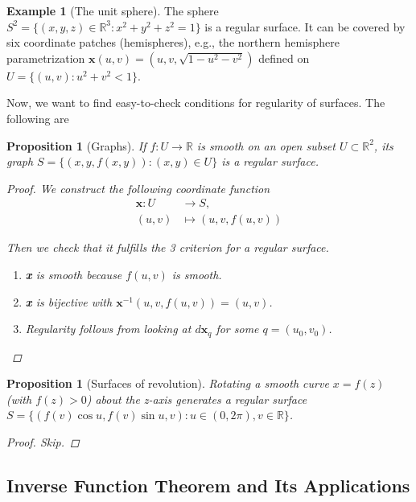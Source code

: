 \documentclass[10pt, a4paper]{article}
\theoremstyle{plain}
\newtheorem{proposition}[theorem]{Proposition}
\theoremstyle{definition}
\newtheorem{example}[theorem]{Example}
\theoremstyle{remark}
\begin{document}
\begin{example}[The unit sphere]
  The sphere $S^2 = \{(x,y,z)\in\mathbb{R}^3: x^2+y^2+z^2=1\}$ is a regular surface. It can be covered by six coordinate patches (hemispheres), e.g., the northern hemisphere parametrization $\mathbf{x}(u,v) = (u,v,\sqrt{1-u^2-v^2})$ defined on $U = \{(u,v): u^2+v^2 < 1\}$.
\end{example}


Now, we want to find easy-to-check conditions for regularity of surfaces. The following are 

\begin{proposition}[Graphs]
  If $f:U\to\mathbb{R}$ is smooth on an open subset $U\subset\mathbb{R}^2$, its graph $S = \{(x,y,f(x,y)) : (x,y)\in U\}$ is a regular surface.

  \begin{proof}
      We construct the following coordinate function
      \begin{align*}
          \textbf{x}:U &\to S, \\
          (u,v) &\mapsto (u,v, f(u,v))
      \end{align*}

      Then we check that it fulfills the 3 criterion for a regular surface.

      \begin{enumerate}
          \item \textbf{x} is smooth because $f(u,v)$ is smooth.
          \item \textbf{x} is bijective with $\textbf{x}^{-1}(u,v, f(u,v)) = (u,v)$.
          \item Regularity follows from looking at $d\textbf{x}_q$ for some $q= (u_0,v_0)$.
      \end{enumerate}
  \end{proof}
\end{proposition}

\begin{proposition}[Surfaces of revolution]
  Rotating a smooth curve $x=f(z)$ (with $f(z)>0$) about the z-axis generates a regular surface $S = \{(f(v)\cos u, f(v)\sin u, v) : u \in (0,2\pi), v \in \mathbb{R}\}$.

  \begin{proof}
      Skip.
  \end{proof}
\end{proposition}


\pagebreak
\subsection{Inverse Function Theorem and Its Applications}
\end{document}
